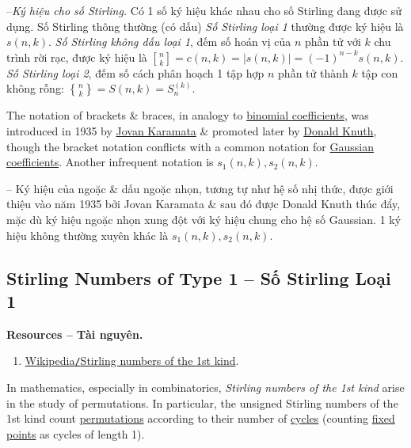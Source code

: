 \documentclass[oneside]{book}
\newcommand{\genstirlingI}[3]{%
	\genfrac{[}{]}{0pt}{#1}{#2}{#3}%
}
\newcommand{\genstirlingII}[3]{%
	\genfrac{\{}{\}}{0pt}{#1}{#2}{#3}%
}
\newcommand{\stirlingI}[2]{\genstirlingI{}{#1}{#2}}
\newcommand{\stirlingII}[2]{\genstirlingII{}{#1}{#2}}
\begin{document}
--{\it Ký hiệu cho số Stirling.} Có 1 số ký hiệu khác nhau cho số Stirling đang được sử dụng. Số Stirling thông thường (có dấu) {\it Số Stirling loại 1} thường được ký hiệu là $s(n,k)$. {\it Số Stirling không dấu loại 1}, đếm số hoán vị của $n$ phần tử với $k$ chu trình rời rạc, được ký hiệu là $\stirlingI{n}{k} = c(n,k) = |s(n,k)| = (-1)^{n-k}s(n,k)$. {\it Số Stirling loại 2}, đếm số cách phân hoạch 1 tập hợp $n$ phần tử thành $k$ tập con không rỗng: $\stirlingII{n}{k} = S(n,k) = S_n^{(k)}$.

The notation of brackets \& braces, in analogy to \href{https://en.wikipedia.org/wiki/Binomial_coefficients}{binomial coefficients}, was introduced in 1935 by \href{https://en.wikipedia.org/wiki/Jovan_Karamata}{\sc Jovan Karamata} \& promoted later by \href{https://en.wikipedia.org/wiki/Donald_Knuth}{\sc Donald Knuth}, though the bracket notation conflicts with a common notation for \href{https://en.wikipedia.org/wiki/Gaussian_coefficient}{Gaussian coefficients}. Another infrequent notation is $s_1(n,k),s_2(n,k)$.

-- Ký hiệu của ngoặc \& dấu ngoặc nhọn, tương tự như hệ số nhị thức, được giới thiệu vào năm 1935 bởi {\sc Jovan Karamata} \& sau đó được {\sc Donald Knuth} thúc đẩy, mặc dù ký hiệu ngoặc nhọn xung đột với ký hiệu chung cho hệ số Gaussian. 1 ký hiệu không thường xuyên khác là $s_1(n,k),s_2(n,k)$.




\subsection{Stirling Numbers of Type 1 -- Số Stirling Loại 1}
\textbf{\textsf{Resources -- Tài nguyên.}}
\begin{enumerate}
	\item \href{https://en.wikipedia.org/wiki/Stirling_numbers_of_the_first_kind}{Wikipedia{\tt/}Stirling numbers of the 1st kind}.
\end{enumerate}
In mathematics, especially in combinatorics, {\it Stirling numbers of the 1st kind} arise in the study of permutations. In particular, the unsigned Stirling numbers of the 1st kind count \href{https://en.wikipedia.org/wiki/Permutation}{permutations} according to their number of \href{https://en.wikipedia.org/wiki/Cycles_and_fixed_points}{cycles} (counting \href{https://en.wikipedia.org/wiki/Fixed_point_(mathematics)}{fixed points} as cycles of length 1).
\end{document}
